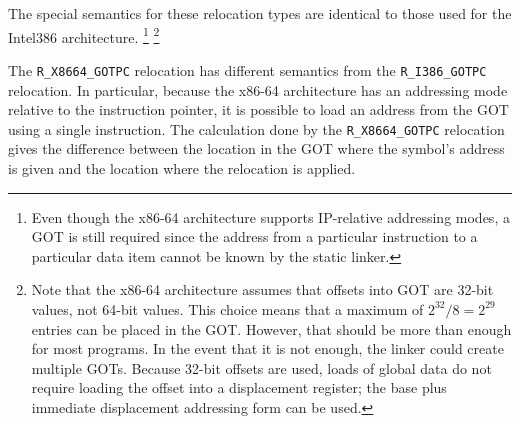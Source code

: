 The special semantics for these relocation types are identical to
those used for the Intel386 architecture.
\footnote{Even though the x86-64 architecture supports IP-relative
  addressing modes, a GOT is still required since the address from
  a particular instruction to a particular data item cannot be
  known by the static linker.}
\footnote{Note that the x86-64 architecture assumes that offsets into
  GOT are 32-bit values, not 64-bit values.  This choice means that a
  maximum of $2^{32}/8 = 2^{29}$ entries can be placed in the GOT.
  However, that should be more than enough for most programs.  In the
  event that it is not enough, the linker could create multiple GOTs.
  Because 32-bit offsets are used, loads of global data do not require
  loading the offset into a displacement register; the base plus
  immediate displacement addressing form can be used.}

The \texttt{R_X8664_GOTPC} relocation has different semantics from the
\texttt{R_I386_GOTPC} relocation.  In particular, because the x86-64
architecture has an addressing mode relative to the instruction
pointer, it is possible to load an address from the GOT using a single
instruction.  The calculation done by the \texttt{R_X8664_GOTPC}
relocation gives the difference between the location in the GOT where
the symbol's address is given and the location where the relocation is
applied.

